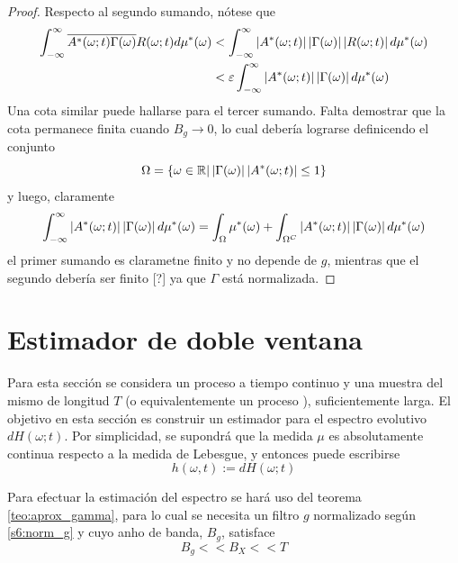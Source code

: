 \begin{proof}
Respecto al segundo sumando, nótese que 
\begin{align*}
\int_{-\infty}^{\infty} \overline{A^{*}(\omega; t) \Gamma(\omega)} R(\omega; t) d\mu^{*}(\omega)
&< \int_{-\infty}^{\infty} \left| A^{*}(\omega; t) \right| \left|  \Gamma(\omega) \right| \left| R(\omega; t) \right| d\mu^{*}(\omega) \\
&< \varepsilon \int_{-\infty}^{\infty} \left| A^{*}(\omega; t) \right|\left|  \Gamma(\omega) \right| d\mu^{*}(\omega)
\end{align*}
Una cota similar puede hallarse para el tercer sumando.
Falta demostrar que la cota permanece finita cuando $B_g \rightarrow 0$, lo cual debería lograrse definicendo el conjunto
\begin{equation}
\Omega = \left\{ \omega \in \mathbb{R} | \left| \Gamma(\omega) \right| \left| A^{*}(\omega; t) \right| \leq 1 \right\} 
\end{equation}
y luego, claramente
\begin{equation}
\int_{-\infty}^{\infty} \left| A^{*}(\omega; t) \right|\left|  \Gamma(\omega) \right| d\mu^{*}(\omega) = 
\int_\Omega \mu^{*}(\omega) + 
\int_{\Omega^{C}} \left| A^{*}(\omega; t) \right|\left|  \Gamma(\omega) \right| d\mu^{*}(\omega)
\end{equation}
el primer sumando es clarametne finito y no depende de $g$, mientras que el segundo debería ser finito [?] ya que $\Gamma$ está normalizada.
\end{proof}


\section{Estimador de doble ventana}
\label{sec:doble_ventana}

Para esta sección se considera un proceso a tiempo continuo \xtin{\R} y una muestra del mismo de longitud $T$ (o equivalentemente un proceso \xtin{[0,T]}), suficientemente larga. El objetivo en esta sección es construir un estimador para el espectro evolutivo $dH(\omega; t)$.
%
Por simplicidad, se supondrá que la medida $\mu$ es absolutamente continua respecto a la medida de Lebesgue, y entonces puede escribirse
\begin{equation}
h(\omega,t) := dH(\omega; t)
\end{equation}

Para efectuar la estimación del espectro se hará uso del teorema \ref{teo:aprox_gamma}, para lo cual se necesita un filtro $g$ normalizado según \ref{s6:norm_g} y cuyo anho de banda, $B_g$, satisface
\begin{equation}
B_g << B_X << T
\label{s6:anchos_banda}
\end{equation}

